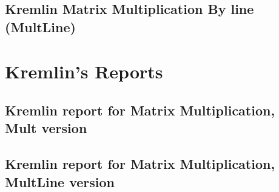 
	
\subsection{Kremlin Matrix Multiplication By line (MultLine)}




\section{Kremlin's Reports}

\subsection{Kremlin report for Matrix Multiplication, Mult version }



\subsection{Kremlin report for Matrix Multiplication, MultLine version }





